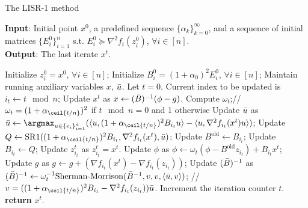 \begin{algorithm}[tb]
\caption{The LISR-1 method}
\label{alg:iqn_algos_efficient}
\textbf{Input}: Initial point $x^0$, a predefined sequence $\{\alpha_k\}_{k=0}^{\infty}$, and a sequence of initial matrices $\{E_i^0\}_{i=1}^n$ s.t. $E_i^0 \succeq \nabla^2 f_i(z_i^0)$, $\forall i \in [n]$.\\
\textbf{Output}: The last iterate $x^t$.
\begin{algorithmic}[1]
\STATE Initialize $z_i^0 = x^0$, $\forall i \in [n]$; Initialize $B_i^0 = (1 + \alpha_0)^2 E_i^0$, $\forall i \in [n]$;
\STATE Maintain running auxiliary variables $x$, $\Bar{u}$.
\STATE Let $t=0$.
\STATE Current index to be updated is $i_t \gets t \mod n$;
\STATE Update $x^t$ as $x \gets (\Bar{B})^{-1} (\phi - g)$.
\STATE Compute $\omega_t$;// $\omega_t = (1 + \alpha_{\ceil{t/n}})^2$ if $t \mod n = 0$ and 1 otherwise
\STATE Update $\Bar{u}$ as $\Bar{u} \gets \argmax_{u \in \{ e_i\}_{i=1}^d} (\langle u, (1 + \alpha_{\ceil{t/n}})^2 B_{i_t} u \rangle - \langle u, \nabla^2 f_{i_t}(x^t) u\rangle)$;
\STATE Update $Q \gets  \mathrm{SR}1 ((1 + \alpha_{\ceil{t/n}})^2 B_{i_t}, \nabla^2 f_{i_t}(x^t), \Bar{u})$;
\STATE Update $B^{\textrm{old}} \gets B_{i_t}$;
\STATE Update $B_{i_t} \gets Q$;
\STATE Update $z_{i_t}^t$ as $z_{i_t}^t = x^t$.
\STATE Update $\phi$ as $\phi \gets \omega_t (\phi - B^{\textrm{old}} z_{i_t}) + B_{i_t} x^t$;
\STATE Update $g$ as $g \gets g + (\nabla f_{i_t} (x^t) - \nabla f_{i_t} (z_{i_t}))$;
\STATE Update $(\Bar{B})^{-1}$ as $(\Bar{B})^{-1} \gets \omega_t^{-1} \mathrm{Sherman}\textrm{-} \mathrm{Morrison}(\Bar{B}^{-1}, v, v, \langle \Bar{u}, v \rangle)$; // $v = ((1 + \alpha_{\ceil{t/n}})^2 B_{i_t} - \nabla^2 f_{i_t}(z_{i_t})) \Bar{u}$.
\STATE Increment the iteration counter $t$.
\ENDWHILE
\STATE \textbf{return} $x^t$.
\end{algorithmic}
\end{algorithm}

